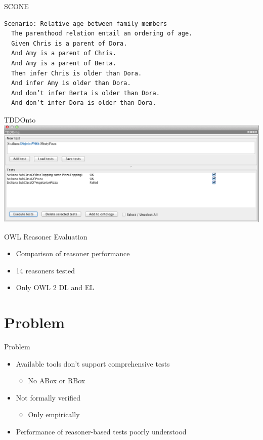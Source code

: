 \documentclass[17pt,mathserif]{beamer}
\begin{document}
\begin{frame}[fragile]{SCONE}
  \begin{lstlisting}[basicstyle=\footnotesize\ttfamily]
Scenario: Relative age between family members
  The parenthood relation entail an ordering of age.
  Given Chris is a parent of Dora.
  And Amy is a parent of Chris.
  And Amy is a parent of Berta.
  Then infer Chris is older than Dora.
  And infer Amy is older than Dora.
  And don’t infer Berta is older than Dora.
  And don’t infer Dora is older than Dora.
  \end{lstlisting}
\end{frame}

\begin{frame}{TDDOnto}
  \includegraphics[width=\textwidth]{tddonto}
\end{frame}

\begin{frame}{OWL Reasoner Evaluation}
  \begin{itemize}
    \item Comparison of reasoner performance
    \item 14 reasoners tested
    \item Only OWL 2 DL and EL
  \end{itemize}
\end{frame}

\section{Problem}

\begin{frame}{Problem}
  \begin{itemize}
    \item Available tools don't support comprehensive tests
    \begin{itemize}
      \item No ABox or RBox
    \end{itemize}
    \item Not formally verified
    \begin{itemize}
      \item Only empirically
    \end{itemize}
    \item Performance of reasoner-based tests poorly understood
  \end{itemize}
\end{frame}
\end{document}
